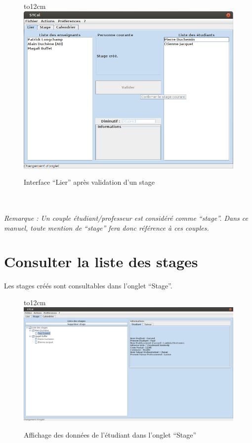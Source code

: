 \documentclass[a4paper,10pt]{report}
\begin{document}
	\begin{figure}[H]
	  \hbox to12cm{\hss\includegraphics[width=14cm]{../general/valide.png}\hss}
	  \caption{Interface ``Lier'' après validation d'un stage}
	\end{figure}
	~\\	  
	  
	\paragraph{}
	  \textit{Remarque : Un couple étudiant/professeur est considéré comme ``stage''. Dans ce manuel, toute mention de ``stage'' fera donc référence à ces couples.}
	  \newpage
    \section{Consulter la liste des stages}
      \paragraph{}
	Les stages créés sont consultables dans l'onglet ``Stage''.
	~\\
	
	\begin{figure}[H]
	  \hbox to12cm{\hss\includegraphics[width=18cm]{../general/Stage.png}\hss}
	  \caption{Affichage des données de l'étudiant dans l'onglet ``Stage''}
	\end{figure}
	~\\	
	
\end{document}
